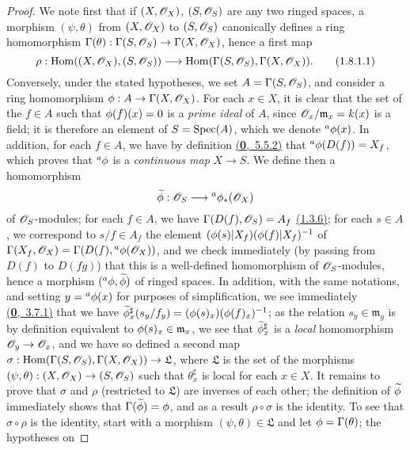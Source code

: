 \begin{proof}
\label{proof-prop-1.1.8.1}
We note first that if $(X,\mathscr{O}_X)$, $(S,\mathscr{O}_S)$ are any two ringed spaces, a morphism
$(\psi,\theta)$ from $(X,\mathscr{O}_X)$ to $(S,\mathscr{O}_S)$ canonically defines a ring homomorphism
$\Gamma(\theta):\Gamma(S,\mathscr{O}_S)\to\Gamma(X,\mathscr{O}_X)$, hence a first map
\[
  \rho:{\mathop{\mathrm{Hom}}\nolimits}((X,\mathscr{O}_X),(S,\mathscr{O}_S))\longrightarrow{\mathop{\mathrm{Hom}}\nolimits}(\Gamma(S,\mathscr{O}_S),\Gamma(X,\mathscr{O}_X)).
  \tag{1.8.1.1}
\]
Conversely, under the stated hypotheses, we set $A=\Gamma(S,\mathscr{O}_S)$, and consider a ring
homomorphism $\phi:A\to\Gamma(X,\mathscr{O}_X)$. For each $x\in X$, it is clear that the set of the
$f\in A$ such that $\phi(f)(x)=0$ is a {\em prime ideal} of $A$, since
$\mathscr{O}_x/\mathfrak{m}_x=k(x)$ is a field; it is therefore an element of $S={\mathop{\mathrm{Spec}}\nolimits}(A)$, which
we denote ${}^a\phi(x)$. In addition, for each $f\in A$, we have by definition
\hyperref[env-0.5.5.2]{(\textbf{0},~5.5.2)} that ${}^a\phi(D(f))=X_f$, which proves that ${}^a\phi$ is a
{\em continuous map} $X\to S$. We define then a homomorphism
\[
  \widetilde{\phi}:\mathscr{O}_S\longrightarrow{}^a\phi_*(\mathscr{O}_X)
\]
of $\mathscr{O}_S$-modules; for each $f\in A$, we have $\Gamma(D(f),\mathscr{O}_S)=A_f$ \hyperref[prop-1.1.3.6]{(1.3.6)};
for each $s\in A$, we correspond to $s/f\in A_f$ the element
$(\phi(s)|X_f)(\phi(f)|X_f)^{-1}$ of $\Gamma(X_f,\mathscr{O}_X)=\Gamma(D(f),{}^a\phi(\mathscr{O}_X))$, and
we check immediately (by passing from $D(f)$ to $D(fg)$) that this is a well-defined
homomorphism of $\mathscr{O}_S$-modules, hence a morphism $({}^a\phi,\widetilde{\phi})$ of ringed
spaces. In addition, with the same notations, and setting $y={}^a\phi(x)$ for purposes of
simplification, we see immediately \hyperref[env-0.3.7.1]{(\textbf{0},~3.7.1)} that we have
$\widetilde{\phi}_x^\sharp(s_y/f_y)=(\phi(s)_x)(\phi(f)_x)^{-1}$; as the relation
$s_y\in\mathfrak{m}_y$ is by definition equivalent to $\phi(s)_x\in\mathfrak{m}_x$, we see
that $\widetilde{\phi}_x^\sharp$ is a {\em local} homomorphism $\mathscr{O}_y\to\mathscr{O}_x$, and we have
so defined a second map $\sigma:{\mathop{\mathrm{Hom}}\nolimits}(\Gamma(S,\mathscr{O}_S),\Gamma(X,\mathscr{O}_X))\to\mathfrak{L}$, where
$\mathfrak{L}$ is the set of the morphisms $(\psi,\theta):(X,\mathscr{O}_X)\to(S,\mathscr{O}_S)$ such that
$\theta_x^\sharp$ is local for each $x\in X$. It remains to prove that $\sigma$ and $\rho$
(restricted to $\mathfrak{L}$) are inverses of each other; the definition of
$\widetilde{\phi}$ immediately shows that $\Gamma(\widetilde{\phi})=\phi$, and as a result
$\rho\circ\sigma$ is the identity. To see that $\sigma\circ\rho$ is the identity, start with a
morphism $(\psi,\theta)\in\mathfrak{L}$ and let $\phi=\Gamma(\theta)$; the hypotheses on

\end{proof}
